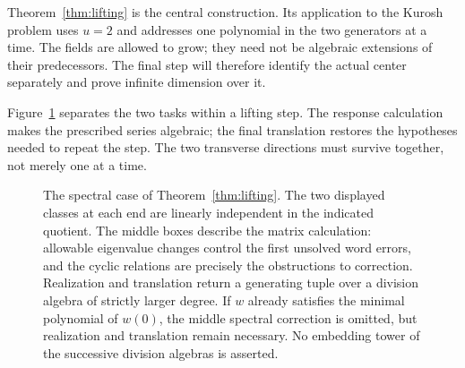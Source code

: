 Theorem~\ref{thm:lifting} is the central construction. Its application to
the Kurosh problem uses $u=2$ and addresses one polynomial in the two
generators at a time. The fields are allowed to grow; they need not be
algebraic extensions of their predecessors. The final step will therefore
identify the actual center separately and prove infinite dimension over it.

Figure~\ref{fig:response-interfaces} separates the two tasks within a
lifting step. The response calculation makes the prescribed series
algebraic; the final translation restores the hypotheses needed to repeat
the step. The two transverse directions must survive together, not merely
one at a time.

\begin{figure}[tbp]
\centering

\caption{The spectral case of Theorem~\ref{thm:lifting}.
The two displayed classes at each end are linearly independent in the
indicated quotient. The middle boxes describe the matrix calculation:
allowable eigenvalue changes control the first unsolved word errors,
and the cyclic relations are precisely the obstructions to correction.
Realization and translation return a generating tuple over a division
algebra of strictly larger degree. If $w$ already satisfies the minimal
polynomial of $w(0)$, the middle spectral correction is omitted, but
realization and translation remain necessary. No embedding tower of
the successive division algebras is asserted.}
\label{fig:response-interfaces}
\end{figure}
\clearpage
